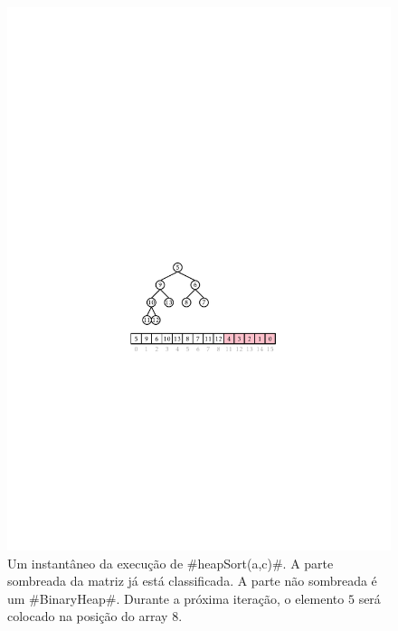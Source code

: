 \begin{figure}
  \begin{center}
    \includegraphics[scale=0.90909]{figs/heapsort}
  \end{center}
  \caption[Heap sort]{
  	Um instantâneo da execução de #heapSort(a,c)#. A parte sombreada da matriz já está classificada. A parte não sombreada é um #BinaryHeap#. Durante a próxima iteração, o elemento $5$ será colocado na posição do array $8$.}
\end{figure}


